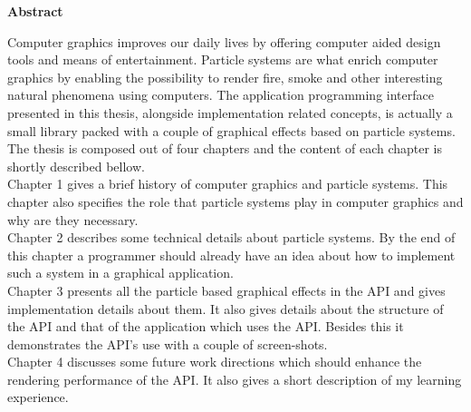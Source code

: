 \thispagestyle{plain}

\begin{center}
	\textbf{Abstract}
\end{center}

Computer graphics improves our daily lives by offering computer aided design tools and means of entertainment. Particle systems are what enrich computer graphics by enabling the possibility to render fire, smoke and other interesting natural phenomena using computers. The application programming interface presented in this thesis, alongside implementation related concepts, is actually a small library packed with a couple of graphical effects based on particle systems. The thesis is composed out of four chapters and the content of each chapter is shortly described bellow.\\

Chapter 1 gives a brief history of computer graphics and particle systems. This chapter also specifies the role that particle systems play in computer graphics and why are they necessary.\\

Chapter 2 describes some technical details about particle systems. By the end of this chapter a programmer should already have an idea about how to implement such a system in a graphical application.\\

Chapter 3 presents all the particle based graphical effects in the API and gives implementation details about them. It also gives details about the structure of the API and that of the application which uses the API. Besides this it demonstrates the API's use with a couple of screen-shots.\\

Chapter 4 discusses some future work directions which should enhance the rendering performance of the API. It also gives a short description of my learning experience.